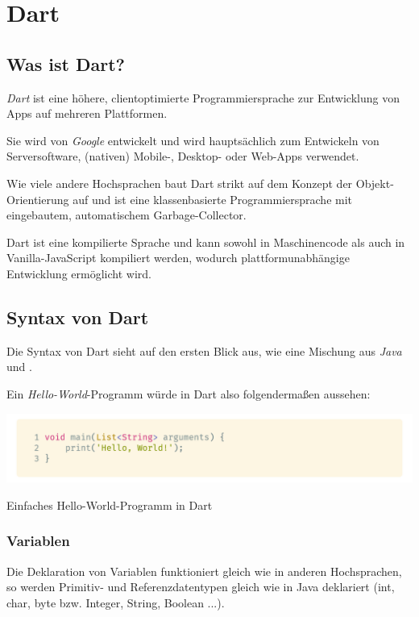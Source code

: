 \section{Dart}

\subsection{Was ist Dart?}

\textit{Dart} ist eine höhere, clientoptimierte Programmiersprache zur Entwicklung von Apps auf mehreren Plattformen.

Sie wird von \textit{Google} entwickelt und wird hauptsächlich zum Entwickeln von Serversoftware, (nativen) Mobile-, Desktop- oder Web-Apps verwendet.

Wie viele andere Hochsprachen baut Dart strikt auf dem Konzept der Objekt-Orientierung auf und ist eine klassenbasierte Programmiersprache mit eingebautem, automatischem
Garbage-Collector.

Dart ist eine kompilierte Sprache und kann sowohl in Maschinencode als auch in Vanilla-JavaScript kompiliert werden, wodurch plattformunabhängige Entwicklung ermöglicht 
wird.

\subsection{Syntax von Dart}

Die Syntax von Dart sieht auf den ersten Blick aus, wie eine Mischung aus \textit{Java} und .

Ein \textit{Hello-World}-Programm würde in Dart also folgendermaßen aussehen:

\begin{code}[h]
    \centering
    \includegraphics[width=1\textwidth]{images/Dart/theory/dartHelloWorld.png}
    \caption{Einfaches Hello-World-Programm in Dart}
\end{code}

\subsubsection{Variablen}

Die Deklaration von Variablen funktioniert gleich wie in anderen Hochsprachen, so werden Primitiv- und Referenzdatentypen gleich wie in Java deklariert (int, char, byte bzw. Integer, String, Boolean ...).

